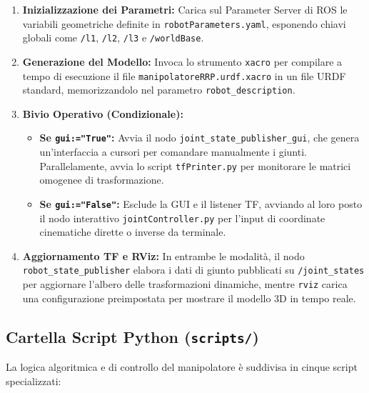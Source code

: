 \documentclass[11pt, a4paper]{report}
\begin{document}
\begin{enumerate}
    \item \textbf{Inizializzazione dei Parametri:} Carica sul Parameter Server di ROS le variabili geometriche definite in \texttt{robotParameters.yaml}, esponendo chiavi globali come \texttt{/l1}, \texttt{/l2}, \texttt{/l3} e \texttt{/worldBase}.

    \item \textbf{Generazione del Modello:} Invoca lo strumento \texttt{xacro} per compilare a tempo di esecuzione il file \texttt{manipolatoreRRP.urdf.xacro} in un file URDF standard, memorizzandolo nel parametro \texttt{robot\_description}.

    \item \textbf{Bivio Operativo (Condizionale):}
    \begin{itemize}
        \item \textbf{Se \texttt{gui:="True"}:} Avvia il nodo \texttt{joint\_state\_publisher\_gui}, che genera un'interfaccia a cursori per comandare manualmente i giunti. Parallelamente, avvia lo script \texttt{tfPrinter.py} per monitorare le matrici omogenee di trasformazione.
        \item \textbf{Se \texttt{gui:="False"}:} Esclude la GUI e il listener TF, avviando al loro posto il nodo interattivo \texttt{jointController.py} per l'input di coordinate cinematiche dirette o inverse da terminale.
    \end{itemize}

    \item \textbf{Aggiornamento TF e RViz:} In entrambe le modalità, il nodo \texttt{robot\_state\_publisher} elabora i dati di giunto pubblicati su \texttt{/joint\_states} per aggiornare l'albero delle trasformazioni dinamiche, mentre \texttt{rviz} carica una configurazione preimpostata per mostrare il modello 3D in tempo reale.
\end{enumerate}
\newpage
\subsection{Cartella Script Python (\texttt{scripts/})}
La logica algoritmica e di controllo del manipolatore è suddivisa in cinque script specializzati:
\end{document}
